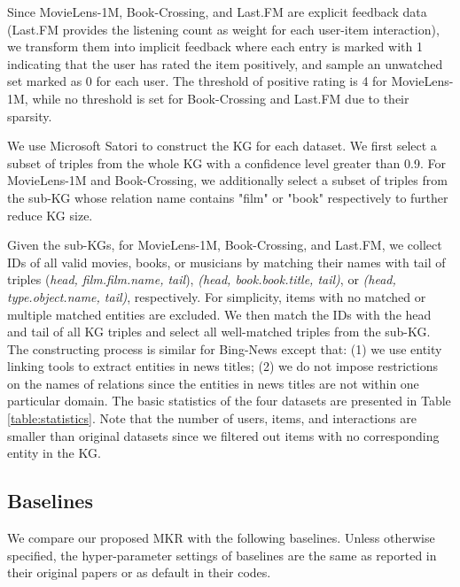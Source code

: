 \documentclass[sigconf]{acmart}
\begin{document}
		Since MovieLens-1M, Book-Crossing, and Last.FM are explicit feedback data (Last.FM
provides the listening count as weight for each user-item interaction), we transform them into implicit feedback where each entry is marked with 1 indicating that the user has rated the item positively, and sample an unwatched set marked as 0 for each user.
		The threshold of positive rating is 4 for MovieLens-1M, while no threshold is set for Book-Crossing and Last.FM due to their sparsity.

		We use Microsoft Satori to construct the KG for each dataset.
		We first select a subset of triples from the whole KG with a confidence level greater than 0.9.
		For MovieLens-1M and Book-Crossing, we additionally select a subset of triples from the sub-KG whose relation name contains "film" or "book" respectively to further reduce KG size.
		
		Given the sub-KGs, for MovieLens-1M, Book-Crossing, and Last.FM, we collect IDs of all valid movies, books, or musicians by matching their names with tail of triples (\textit{head, film.film.name, tail}), \textit{(head, book.book.title, tail)}, or \textit{(head, type.object.name, tail)}, respectively.
		For simplicity, items with no matched or multiple matched entities are excluded.
		We then match the IDs with the head and tail of all KG triples and select all well-matched triples from the sub-KG.
		The constructing process is similar for Bing-News except that: (1) we use entity linking tools to extract entities in news titles; (2) we do not impose restrictions on the names of relations since the entities in news titles are not within one particular domain.
		The basic statistics of the four datasets are presented in Table \ref{table:statistics}.
		Note that the number of users, items, and interactions are smaller than original datasets since we filtered out items with no corresponding entity in the KG.
	
	
	\subsection{Baselines}
		We compare our proposed MKR with the following baselines.
		Unless otherwise specified, the hyper-parameter settings of baselines are the same as reported in their original papers or as default in their codes.
		
\end{document}
